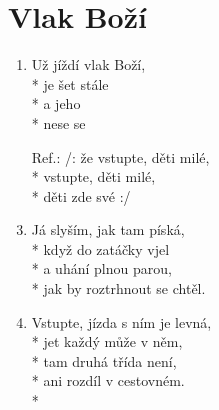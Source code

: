 \section{Vlak Boží}
\begin{enumerate}
\item Už jíždí vlak Boží, \\*
je šet stále  \\*
a   jeho  \\*
nese  se 
\item[Ref.:] /: že  vstupte, děti milé,  \\*
vstupte, děti milé,  \\*
děti  zde   své  :/
\item Já slyším, jak tam píská,\\*
když do zatáčky vjel\\*
a uhání plnou parou,\\*
jak by roztrhnout se chtěl.
\item Vstupte, jízda s ním je levná,\\*
jet každý může v něm,\\*
tam druhá třída není,\\*
ani rozdíl v cestovném.\\*
\end{enumerate}
